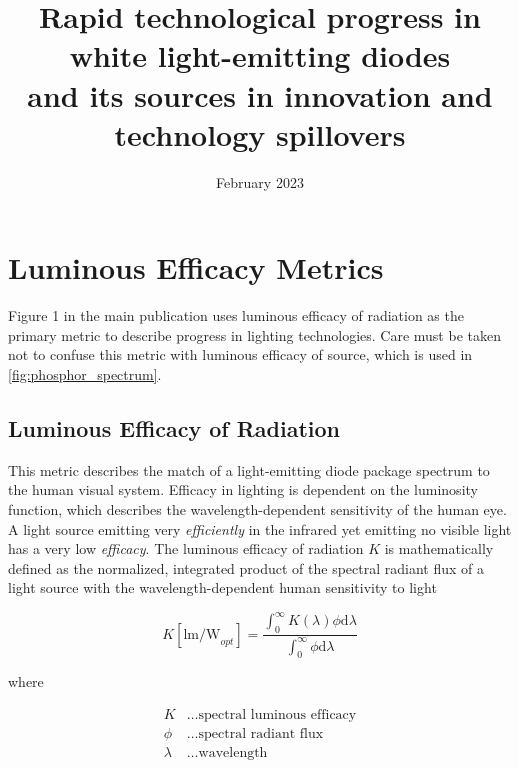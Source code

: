 \documentclass[10pt]{article}
\title{Rapid technological progress in white light-emitting diodes \\ and its sources in innovation and technology spillovers  }
\date{February 2023}
\newcounter{defcounter}
\newenvironment{myequation}{%
\addtocounter{equation}{-1}
\refstepcounter{defcounter}
\renewcommand\theequation{SI\thedefcounter}
\begin{equation}}
{\end{equation}}
\begin{document}
\setlength{\fboxsep}{10pt}

\tableofcontents

\newpage

\section{Luminous Efficacy Metrics}

Figure 1 in the main publication uses luminous efficacy of radiation as the primary metric to describe progress in lighting technologies. Care must be taken not to confuse this metric with luminous efficacy of source, which is used in \ref{fig:phosphor_spectrum}.

\subsection{Luminous Efficacy of Radiation}
\label{subsec:ler}

This metric describes the match of a light-emitting diode package spectrum to the human visual system. Efficacy in lighting is dependent on the luminosity function, which describes the wavelength-dependent sensitivity of the human eye. A light source emitting very \textit{efficiently} in the infrared yet emitting no visible light has a very low \textit{efficacy}. The luminous efficacy of radiation $K$ is mathematically defined as the normalized, integrated product of the spectral radiant flux of a light source with the wavelength-dependent human sensitivity to light \cite{cie-term-effrad}

\begin{myequation}
\label{eqn:ler}
    K [\text{lm/W}_{opt}]= \frac{\int_0^\infty K( \lambda ) \phi \text{d} \lambda}{\int_0^\infty \phi \text{d} \lambda}
\end{myequation}

where

\begin{align*}
    K &\dots \text{spectral luminous efficacy} \\
    \phi &\dots \text{spectral radiant flux} \\
    \lambda &\dots \text{wavelength}
\end{align*}
\end{document}
